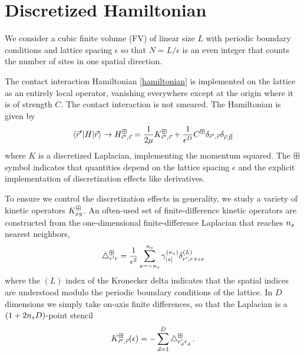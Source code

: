 \section{Discretized Hamiltonian}\label{sec:hamiltonian}

We consider a cubic finite volume (FV) of linear size $L$ with periodic boundary conditions and lattice spacing $\epsilon$ so that $N=L/\epsilon$ is an even integer that counts the number of sites in one spatial direction.

The contact interaction Hamiltonian \eqref{hamiltonian} is implemented on the lattice as an entirely local operator, vanishing everywhere except at the origin where it is of strength $C$.
The contact interaction is not smeared.
The Hamiltonian is given by
\begin{equation}
    \left\langle \vec{r}' \middle| H \middle| \vec{r} \right\rangle
    \rightarrow
    H_{\vec{r}',\vec{r}}^\boxplus
    =
    \frac{1}{2\mu} K_{\vec{r}',\vec{r}}^\boxplus + \frac{1}{\epsilon^D} C^\boxplus \delta_{\vec{r}',\vec{r}} \delta_{\vec{r},\vec{0}}
\end{equation}
where $K$ is a discretized Laplacian, implementing the momentum squared.
The $\boxplus$ symbol indicates that quantities depend on the lattice spacing $\epsilon$ and the explicit implementation of discretization effects like derivatives.

To ensure we control the discretization effects in generality, we study a variety of kinetic operators $K_{xy}^\boxplus$.
An often-used set of finite-difference kinetic operators are constructed from the one-dimensional finite-difference Laplacian that reaches ${n_s}$ nearest neighbors,
\begin{equation}
    \mathop{}\!\mathbin\bigtriangleup^\boxplus_{r'r} = \frac{1}{\epsilon^2}\sum_{s=-{n_s}}^{{n_s}} \gamma_{\left| s \right|}^{({n_s})} \delta_{r',r+\epsilon s}^{(L)}
\end{equation}
where the $(L)$ index of the Kronecker delta indicates that the spatial indices are understood modulo the periodic boundary conditions of the lattice.
In $D$ dimensions we simply take on-axis finite differences, so that the Laplacian is a $(1+2{n_s} D)$-point stencil
\begin{equation}\label{eq:kinetic}
    K_{\vec{r}',\vec{r}}^\boxplus(\epsilon)
    =
    - \sum_{d=1}^D \mathop{}\!\mathbin\bigtriangleup_{r_d'r_d^{}}^\boxplus
    \, .
\end{equation} 

